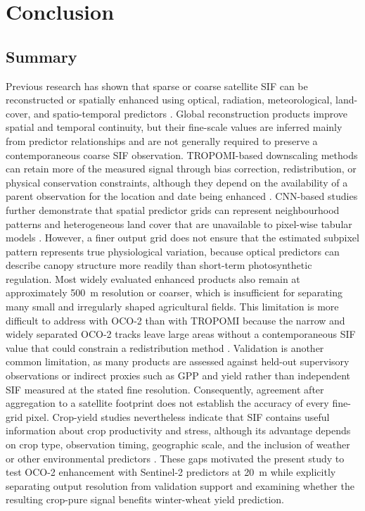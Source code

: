 \chapter{Conclusion\label{cha:chapter7}}


\section{Summary\label{sec:summary}}

Previous research has shown that sparse or coarse satellite SIF can be reconstructed or spatially enhanced using optical, radiation, meteorological, land-cover, and spatio-temporal predictors \cite{li2019global,zhang2018global,shen2022spatiotemporal}. Global reconstruction products improve spatial and temporal continuity, but their fine-scale values are inferred mainly from predictor relationships and are not generally required to preserve a contemporaneous coarse SIF observation. TROPOMI-based downscaling methods can retain more of the measured signal through bias correction, redistribution, or physical conservation constraints, although they depend on the availability of a parent observation for the location and date being enhanced \cite{hu2024spatially,chen2025improved,zhang2023generating}. CNN-based studies further demonstrate that spatial predictor grids can represent neighbourhood patterns and heterogeneous land cover that are unavailable to pixel-wise tabular models \cite{gensheimer2022convolutional,du2025cnsif}. However, a finer output grid does not ensure that the estimated subpixel pattern represents true physiological variation, because optical predictors can describe canopy structure more readily than short-term photosynthetic regulation. Most widely evaluated enhanced products also remain at approximately 500~m resolution or coarser, which is insufficient for separating many small and irregularly shaped agricultural fields. This limitation is more difficult to address with OCO-2 than with TROPOMI because the narrow and widely separated OCO-2 tracks leave large areas without a contemporaneous SIF value that could constrain a redistribution method \cite{yu2019high}. Validation is another common limitation, as many products are assessed against held-out supervisory observations or indirect proxies such as GPP and yield rather than independent SIF measured at the stated fine resolution. Consequently, agreement after aggregation to a satellite footprint does not establish the accuracy of every fine-grid pixel. Crop-yield studies nevertheless indicate that SIF contains useful information about crop productivity and stress, although its advantage depends on crop type, observation timing, geographic scale, and the inclusion of weather or other environmental predictors \cite{peng2020assessing,song2018satellite,qiu2022monitoring}. These gaps motivated the present study to test OCO-2 enhancement with Sentinel-2 predictors at 20~m while explicitly separating output resolution from validation support and examining whether the resulting crop-pure signal benefits winter-wheat yield prediction.

